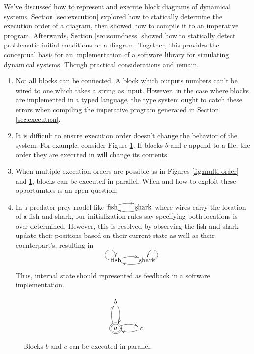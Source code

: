 \documentclass[twocolumn]{article}
\begin{document}
We've discussed how to represent and execute block diagrams of dynamical systems. Section \ref{sec:execution} explored how to statically determine the execution order of a diagram, then showed how to compile it to an imperative program. Afterwards, Section \ref{sec:soundness} showed how to statically detect problematic initial conditions on a diagram. Together, this provides the conceptual basis for an implementation of a software library for simulating dynamical systems. Though practical considerations and remain.

\begin{enumerate}
    \item Not all blocks can be connected. A block which outputs numbers can't be wired to one which takes a string as input. However, in the case where blocks are implemented in a typed language, the type system ought to catch these errors when compiling the imperative program generated in Section \ref{sec:execution}.

    \item It is difficult to ensure execution order doesn't change the behavior of the system. For example, consider Figure \ref{fig:parallel}. If blocks $b$ and $c$ append to a file, the order they are executed in will change its contents.

    \item  When multiple execution orders are possible as in Figures \ref{fig:multi-order} and \ref{fig:parallel}, blocks can be executed in parallel. When and how to exploit these opportunities is an open question.

    \item In a predator-prey model like $\xymatrix@1{\text{fish} \ar@/^/[r] & \text{shark} \ar@/^/[l]}$ where wires carry the location of a fish and shark, our initialization rules say specifying both locations is over-determined. However, this is resolved by observing the fish and shark update their positions based on their current state as well as their counterpart's, resulting in

    \[
    \xymatrix@1{\text{fish} \ar@(l, u)[] \ar@/^/[r] & \text{shark} \ar@(r, u)[] \ar@/^/[l]}
    \]

    Thus, internal state should represented as feedback in a software implementation.

\end{enumerate}

\begin{figure}[h]
\[
\xymatrix{
b \\
*++[o][F=]{a} \ar@/^/[r] \ar@/_/@{<-}[r] \ar@/^/[u] \ar@/_/@{<-}[u] & c \\
}
\]
    \caption{Blocks $b$ and $c$ can be executed in parallel.}
    \label{fig:parallel}
\end{figure}

\printbibliography
\end{document}
